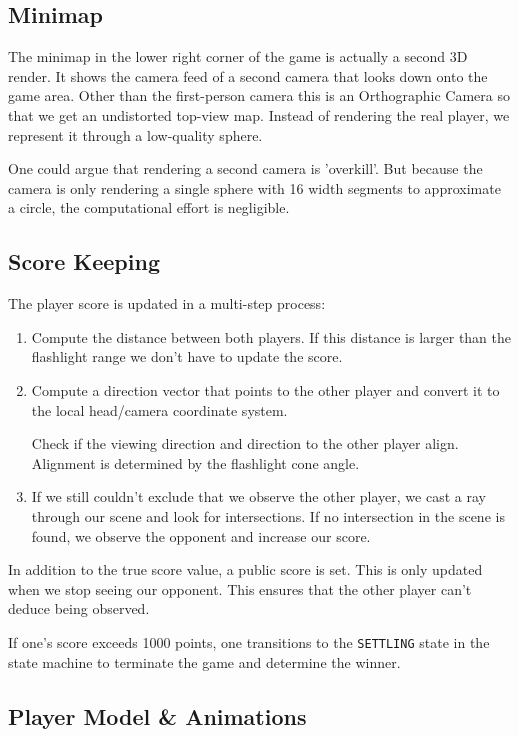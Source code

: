 \documentclass[11pt]{article}
\begin{document}
\subsection{Minimap}
\par The minimap in the lower right corner of the game is actually a second 3D render. It shows the camera feed of a second camera that looks down onto the game area. Other than the first-person camera this is an Orthographic Camera so that we get an undistorted top-view map. Instead of rendering the real player, we represent it through a low-quality sphere.
\par One could argue that rendering a second camera is 'overkill'. But because the camera is only rendering a single sphere with 16 width segments to approximate a circle, the computational effort is negligible.

\subsection{Score Keeping}
\par The player score is updated in a multi-step process:
\begin{enumerate}
	\item Compute the distance between both players. If this distance is larger than the flashlight range we don't have to update the score.
	\item Compute a direction vector that points to the other player and convert it to the local head/camera coordinate system.
		\par Check if the viewing direction and direction to the other player align. Alignment is determined by the flashlight cone angle.
	\item If we still couldn't exclude that we observe the other player, we cast a ray through our scene and look for intersections. If no intersection in the scene is found, we observe the opponent and increase our score.
\end{enumerate}
\par In addition to the true score value, a public score is set. This is only updated when we stop seeing our opponent. This ensures that the other player can't deduce being observed.
\par If one's score exceeds 1000 points, one transitions to the \texttt{SETTLING} state in the state machine to terminate the game and determine the winner.

\subsection{Player Model \& Animations}
\end{document}
